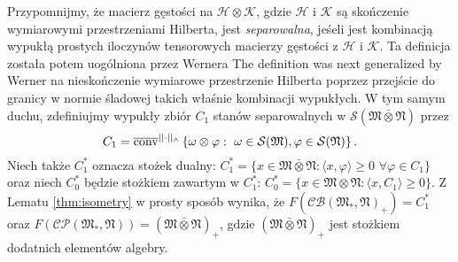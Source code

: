 Przypomnijmy, że macierz gęstości na $\mathcal{H}\otimes\mathcal{K}$,
gdzie $\mathcal{H}$ i $\mathcal{K}$
są skończenie wymiarowymi przestrzeniami Hilberta,
jest \emph{separowalna},
jeśeli jest kombinacją wypukłą prostych iloczynów tensorowych macierzy gęstości
z $\mathcal{H}$ i $\mathcal{K}$.
Ta definicja została potem uogólniona przez Wernera
The definition was next generalized by Werner \cite{werner1989quantum}
na nieskończenie wymiarowe przestrzenie Hilberta poprzez
przejście do granicy w normie śladowej takich właśnie kombinacji wypukłych.
W tym samym duchu, zdefiniujmy wypukły zbiór $C_1$
stanów separowalnych w
$\mathcal{S}(\mathfrak{M} \bar{\otimes} \mathfrak{N})$ przez
\begin{equation}
C_{1} = \overline{{\rm conv}}^{||\cdot||_{\wedge}}
\left \{\omega \otimes \varphi: \, \,\omega \in \mathcal{S}(\mathfrak{M}),
\varphi \in \mathcal{S}(\mathfrak{N})\right \}.
\end{equation}
Niech także $C_{1}^{*}$ oznacza stożek dualny:
$C_{1}^{*} = \{ x \in \mathfrak{M} \bar{\otimes} \mathfrak{N}:
 \langle x , \varphi \rangle \geq 0 \,\, \forall \varphi \in C_{1} \}$ oraz
niech $C_{0}^{*}$ będzie stożkiem zawartym w
$C_{1}^{*}$:
$C_{0}^{*} = \{ x \in \mathfrak{M} \otimes \mathfrak{N}:\langle x , C_{1} \rangle \geq 0 \}$.
Z Lematu \ref{thm:isometry} w prosty sposób wynika, że
$F(\mathcal{CB}(\mathfrak{M}_{*}, \mathfrak{N})_{+}) = C_{1}^{*}$ oraz
$F(\mathcal{CP}(\mathfrak{M}_{*}, \mathfrak{N})) = (\mathfrak{M} \bar{\otimes} \mathfrak{N})_{+}$,
gdzie $(\mathfrak{M} \bar{\otimes} \mathfrak{N})_{+}$
jest stożkiem dodatnich elementów algebry.

